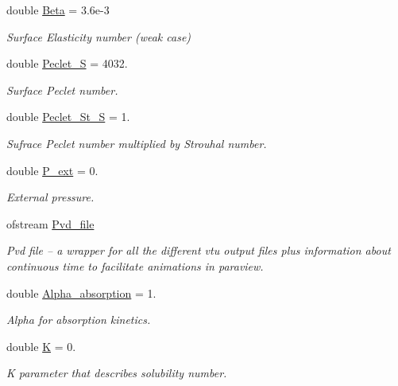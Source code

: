 \begin{DoxyCompactItemize}
double \hyperlink{namespaceGlobal__Physical__Variables_a351a17b52cfcabc688393423f3de361b}{Beta} = 3.\+6e-\/3
\begin{DoxyCompactList}\small\item\em Surface Elasticity number (weak case) \end{DoxyCompactList}\item 
double \hyperlink{namespaceGlobal__Physical__Variables_a99dc85e71075cd6efb06e692d8a15bcd}{Peclet\+\_\+S} = 4032.
\begin{DoxyCompactList}\small\item\em Surface Peclet number. \end{DoxyCompactList}\item 
double \hyperlink{namespaceGlobal__Physical__Variables_abec1e1c8c78ade3a7b2e7396321c6466}{Peclet\+\_\+\+St\+\_\+S} = 1.
\begin{DoxyCompactList}\small\item\em Sufrace Peclet number multiplied by Strouhal number. \end{DoxyCompactList}\item 
double \hyperlink{namespaceGlobal__Physical__Variables_a0406c0cbd463d1df2458fe5de98a00eb}{P\+\_\+ext} = 0.
\begin{DoxyCompactList}\small\item\em External pressure. \end{DoxyCompactList}\item 
ofstream \hyperlink{namespaceGlobal__Physical__Variables_a4f2fe790aa186202e4e2d5f6ee21d7f4}{Pvd\+\_\+file}
\begin{DoxyCompactList}\small\item\em Pvd file -- a wrapper for all the different vtu output files plus information about continuous time to facilitate animations in paraview. \end{DoxyCompactList}\item 
double \hyperlink{namespaceGlobal__Physical__Variables_a012c14d34c5c0e65d114711c34a4361e}{Alpha\+\_\+absorption} = 1.
\begin{DoxyCompactList}\small\item\em Alpha for absorption kinetics. \end{DoxyCompactList}\item 
double \hyperlink{namespaceGlobal__Physical__Variables_a9da8be10d9e20eb0329af7fd8d6e0e98}{K} = 0.
\begin{DoxyCompactList}\small\item\em K parameter that describes solubility number. \end{DoxyCompactList}\item 

\end{DoxyCompactItemize}
